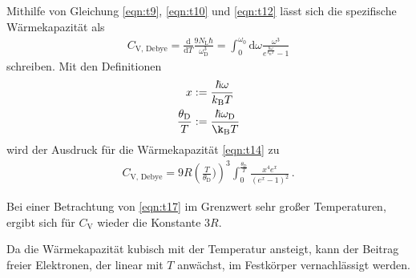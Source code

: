 Mithilfe von Gleichung \ref{eqn:t9}, \ref{eqn:t10} und \ref{eqn:t12}
lässt sich die spezifische Wärmekapazität als
\begin{align}
	C_{\text{V, Debye}} = \frac{\mathrm{d}}{\mathrm{d}T} \frac{9 N_{\text{L}} \hbar}{\omega_{\text{D}}^{3}}
	= \int_{0}^{\omega_{0}} \mathrm{d}\omega \frac{\omega^{3}}{e^{\frac{\hbar \omega}{k_{\text{B}} T}} - 1} \label{eqn:t14}
\end{align}
schreiben.
Mit den Definitionen
\begin{align}
	x &:= \frac{\hbar \omega}{k_{\text{B}} T} \label{eqn:t15} \\
	\frac{\theta_{\text{D}}}{T} &:= \frac{\hbar \omega_{\text{D}}}{\k_{\text{B}} T} \label{eqn:t16}
\end{align}
wird der Ausdruck für die Wärmekapazität \ref{eqn:t14} zu
\begin{align}
	C_{\text{V, Debye}} = 9 R \left(\frac{T}{\theta_{\text{D}}})\right)^{3}
	\int_{0}^{\frac{\theta_{\text{D}}}{T}} \frac{x^{4} e^{x}}{\left( e^{x} - 1 \right)^{2}} \, . \label{eqn:t17}
\end{align}

Bei einer Betrachtung von \ref{eqn:t17} im Grenzwert sehr großer Temperaturen,
ergibt sich für $C_{\text{V}}$ wieder die Konstante $3R$.

Da die Wärmekapazität kubisch mit der Temperatur ansteigt, kann der Beitrag freier Elektronen, der linear mit $T$ anwächst, im Festkörper vernachlässigt werden. \cite{sample}

